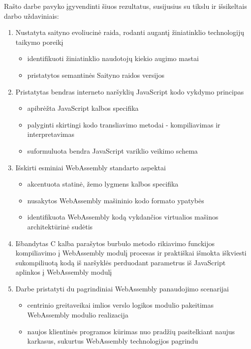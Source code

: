 \documentclass{VUMIFPSkursinis}
\begin{document}
\begin{nopagebreak}
Rašto darbe pavyko įgyvendinti šiuos rezultatus, susijusius su tikslu ir išsikeltais darbo uždaviniais:
\begin{enumerate}
  \item Nustatyta saityno evoliucinė raida, rodanti augantį žiniatinklio technologijų taikymo poreikį
  \begin{itemize}
  \item identifikuoti žiniatinklio naudotojų kiekio augimo mastai
  \item pristatytos semantinės Saityno raidos versijos
  \end{itemize}
    \item Pristatytas bendras interneto naršyklių JavaScript kodo vykdymo principas
  \begin{itemize}
  \item apibrėžta JavaScript kalbos specifika
  \item palyginti skirtingi kodo transliavimo metodai - kompiliavimas ir interpretavimas
  \item suformuluota bendra JavaScript variklio veikimo schema
  \end{itemize}
  \item Išskirti esminiai WebAssembly standarto aspektai
  \begin{itemize}
    \item akcentuota statinė, žemo lygmens kalbos specifika
    \item nusakytos WebAssembly mašininio kodo formato ypatybės
    \item identifikuota WebAssembly kodą vykdančios virtualios mašinos architektūrinė sudėtis
    \end{itemize}
  \item Išbandytas C kalba parašytos burbulo metodo rikiavimo funckijos kompiliavimo į WebAssembly modulį procesas ir praktiškai išmokta iškviesti sukompiliuotą kodą iš naršyklės perduodant parametrus iš JavaScript aplinkos  į WebAssembly modulį
  \item Darbe pristatyti du pagrindiniai WebAssembly panaudojimo scenarijai
\begin{itemize}
  \item centrinio greitaveikai imlios verslo logikos modulio pakeitimas WebAssembly modulio realizacija
  \item naujos klientinės programos kūrimas nuo pradžių pasitelkiant naujus karkasus, sukurtus WebAssembly technologijos pagrindu
\end{itemize}
\end{enumerate}


\end{nopagebreak}
\end{document}
